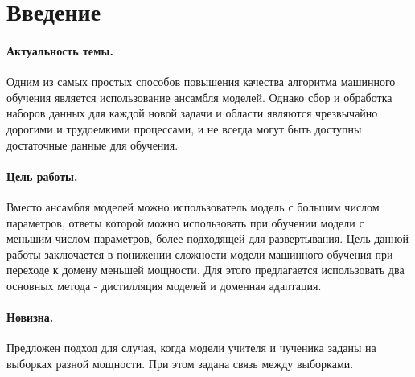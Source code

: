 \newpage


\section{Введение}
\paragraph{Актуальность темы.} Одним из самых простых способов повышения качества алгоритма машинного обучения является использование ансамбля моделей. Однако сбор и обработка наборов данных для каждой новой задачи и области являются чрезвычайно дорогими и трудоемкими процессами, и не всегда могут быть доступны достаточные данные для обучения.
\paragraph{Цель работы.} Вместо ансамбля моделей можно использователь модель с большим числом параметров, ответы которой можно использовать при обучении модели с меньшим числом параметров, более подходящей для развертывания. Цель данной работы заключается в понижении сложности модели машинного обучения при переходе к домену меньшей мощности. Для этого предлагается использовать два основных метода - дистилляция моделей и доменная адаптация.
\paragraph{Новизна.} Предложен подход для случая, когда модели учителя и чученика заданы на выборках разной мощности. При этом задана связь между выборками.
